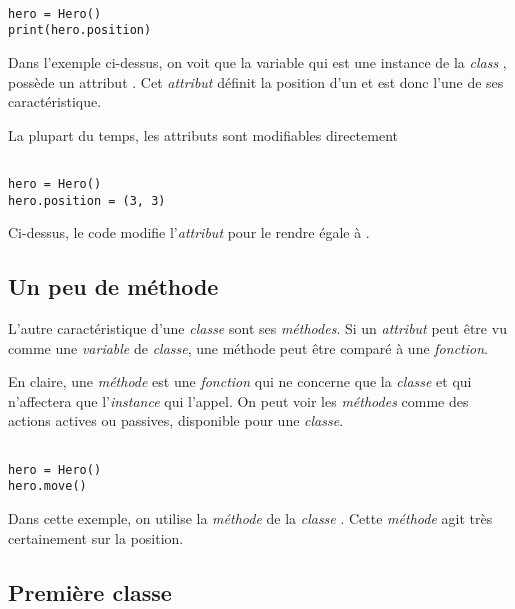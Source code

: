 \begin{lstlisting}

hero = Hero()
print(hero.position) 

\end{lstlisting}

Dans l'exemple ci-dessus, on voit que la variable  qui est une instance de la \emph{class} , possède un attribut . Cet \emph{attribut} définit la position d'un  et est donc l'une de ses caractéristique.

La plupart du temps, les attributs sont modifiables directement  

\begin{lstlisting}

hero = Hero()
hero.position = (3, 3)

\end{lstlisting}

Ci-dessus, le code modifie l'\emph{attribut}  pour le rendre égale à .

\subsection{Un peu de méthode}

L'autre caractéristique d'une \emph{classe} sont ses \emph{méthodes}.
Si un \emph{attribut} peut être vu comme une \emph{variable} de \emph{classe}, une méthode peut être comparé à une \emph{fonction}.

En claire, une \emph{méthode} est une \emph{fonction} qui ne concerne que la \emph{classe} et qui n'affectera que l'\emph{instance} qui l'appel.
On peut voir les \emph{méthodes} comme des actions actives ou passives, disponible pour une \emph{classe}.

\begin{lstlisting}

hero = Hero()
hero.move()

\end{lstlisting}

Dans cette exemple, on utilise la \emph{méthode}  de la \emph{classe} .
Cette \emph{méthode} agit très certainement sur la position.


\subsection{Première classe}

